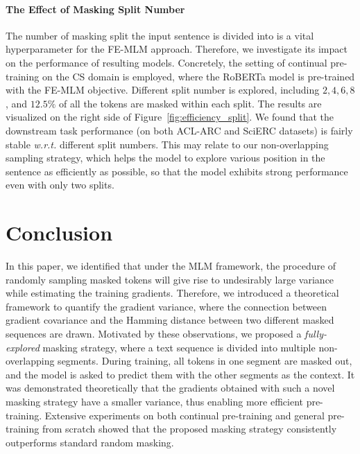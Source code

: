 \documentclass{article} \usepackage{iclr2021_conference,times}
\theoremstyle{plain}
\begin{document}
\paragraph{The Effect of Masking Split Number} The number of masking split the input sentence is divided into is a vital hyperparameter for the FE-MLM approach. Therefore, we investigate its impact on the performance of resulting models. Concretely, the setting of continual pre-training on the CS domain is employed, where the RoBERTa model is pre-trained with the  FE-MLM objective. Different split number is explored, including $2, 4, 6, 8$, and $12.5\%$ of all the tokens are masked within each split. The results are visualized on the right side of Figure~\ref{fig:efficiency_split}. We found that the downstream task performance (on both ACL-ARC and SciERC datasets) is fairly stable \emph{w.r.t.} different split numbers. This may relate to our non-overlapping sampling strategy, which helps the model to explore various position in the sentence as efficiently as possible, so that the model exhibits strong performance even with only two splits.
\vspace{-4mm}
\section{Conclusion}
\vspace{-3mm}
In this paper, we identified that under the MLM framework, the procedure of randomly sampling masked tokens will give rise to undesirably large variance while estimating the training gradients.
Therefore, we introduced a theoretical framework to quantify the gradient variance, where the connection between gradient covariance and the Hamming distance between two different masked sequences are drawn.
Motivated by these observations, we proposed a \emph{fully-explored} masking strategy, where a text sequence is divided into multiple non-overlapping segments. During training, all tokens in one segment are masked out, and the model is asked to predict them with the other segments as the context. 
It was demonstrated theoretically that the gradients obtained with such a novel masking strategy have a smaller variance, thus enabling more efficient pre-training. 
Extensive experiments on both continual pre-training and general pre-training from scratch showed that the proposed masking strategy consistently outperforms standard random masking.
\end{document}
